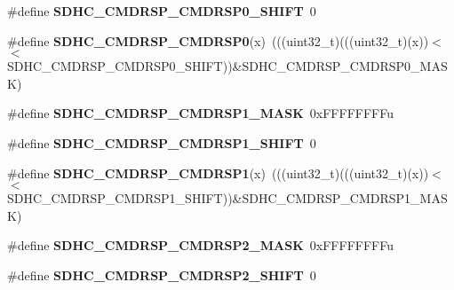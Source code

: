 \begin{DoxyCompactItemize}
\item 
\#define {\bfseries S\+D\+H\+C\+\_\+\+C\+M\+D\+R\+S\+P\+\_\+\+C\+M\+D\+R\+S\+P0\+\_\+\+S\+H\+I\+FT}~0\hypertarget{group__SDHC__Register__Masks_gaea81f8c10607500c0232c031cb1c736b}{}\label{group__SDHC__Register__Masks_gaea81f8c10607500c0232c031cb1c736b}

\item 
\#define {\bfseries S\+D\+H\+C\+\_\+\+C\+M\+D\+R\+S\+P\+\_\+\+C\+M\+D\+R\+S\+P0}(x)~(((uint32\+\_\+t)(((uint32\+\_\+t)(x))$<$$<$S\+D\+H\+C\+\_\+\+C\+M\+D\+R\+S\+P\+\_\+\+C\+M\+D\+R\+S\+P0\+\_\+\+S\+H\+I\+FT))\&S\+D\+H\+C\+\_\+\+C\+M\+D\+R\+S\+P\+\_\+\+C\+M\+D\+R\+S\+P0\+\_\+\+M\+A\+SK)\hypertarget{group__SDHC__Register__Masks_ga9e228a5f41a153a74c6c5e567b4ec1ef}{}\label{group__SDHC__Register__Masks_ga9e228a5f41a153a74c6c5e567b4ec1ef}

\item 
\#define {\bfseries S\+D\+H\+C\+\_\+\+C\+M\+D\+R\+S\+P\+\_\+\+C\+M\+D\+R\+S\+P1\+\_\+\+M\+A\+SK}~0x\+F\+F\+F\+F\+F\+F\+F\+Fu\hypertarget{group__SDHC__Register__Masks_gaf2029a539168eda397f19588b928af0f}{}\label{group__SDHC__Register__Masks_gaf2029a539168eda397f19588b928af0f}

\item 
\#define {\bfseries S\+D\+H\+C\+\_\+\+C\+M\+D\+R\+S\+P\+\_\+\+C\+M\+D\+R\+S\+P1\+\_\+\+S\+H\+I\+FT}~0\hypertarget{group__SDHC__Register__Masks_ga5954455de5b963fe88033ee57abc8682}{}\label{group__SDHC__Register__Masks_ga5954455de5b963fe88033ee57abc8682}

\item 
\#define {\bfseries S\+D\+H\+C\+\_\+\+C\+M\+D\+R\+S\+P\+\_\+\+C\+M\+D\+R\+S\+P1}(x)~(((uint32\+\_\+t)(((uint32\+\_\+t)(x))$<$$<$S\+D\+H\+C\+\_\+\+C\+M\+D\+R\+S\+P\+\_\+\+C\+M\+D\+R\+S\+P1\+\_\+\+S\+H\+I\+FT))\&S\+D\+H\+C\+\_\+\+C\+M\+D\+R\+S\+P\+\_\+\+C\+M\+D\+R\+S\+P1\+\_\+\+M\+A\+SK)\hypertarget{group__SDHC__Register__Masks_gaf0fd5fa34fba78caff6561aba2c97e03}{}\label{group__SDHC__Register__Masks_gaf0fd5fa34fba78caff6561aba2c97e03}

\item 
\#define {\bfseries S\+D\+H\+C\+\_\+\+C\+M\+D\+R\+S\+P\+\_\+\+C\+M\+D\+R\+S\+P2\+\_\+\+M\+A\+SK}~0x\+F\+F\+F\+F\+F\+F\+F\+Fu\hypertarget{group__SDHC__Register__Masks_ga60782d85358658786d1a76fe99379622}{}\label{group__SDHC__Register__Masks_ga60782d85358658786d1a76fe99379622}

\item 
\#define {\bfseries S\+D\+H\+C\+\_\+\+C\+M\+D\+R\+S\+P\+\_\+\+C\+M\+D\+R\+S\+P2\+\_\+\+S\+H\+I\+FT}~0\hypertarget{group__SDHC__Register__Masks_ga68102815f97db907271c9feb9b35d48f}{}\label{group__SDHC__Register__Masks_ga68102815f97db907271c9feb9b35d48f}


\end{DoxyCompactItemize}

